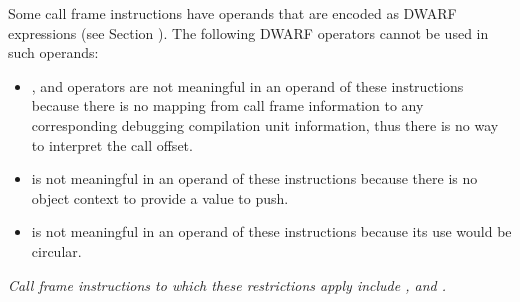 Some call frame instructions have operands that are encoded
as DWARF expressions 
(see Section ). 
The following DWARF
operators cannot be used in such operands:


\begin{itemize}
\item {},  
and  operators
are not meaningful in an operand of these instructions
because there is no mapping from call frame information to
any corresponding debugging compilation unit information,
thus there is no way to interpret the call offset.

\item {} is not meaningful in an operand
of these instructions because there is no object context to
provide a value to push.

\item {} is not meaningful in an operand of
these instructions because its use would be circular.
\end{itemize}

\textit{Call frame instructions to which these restrictions apply
include , 
and .}

